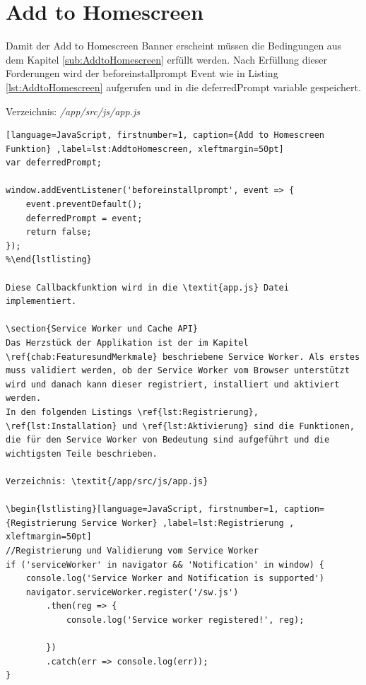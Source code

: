 \section{Add to Homescreen}
Damit der Add to Homescreen Banner erscheint müssen die Bedingungen aus dem Kapitel \ref{sub:AddtoHomescreen} erfüllt werden.
Nach Erfüllung dieser Forderungen wird der beforeinstallprompt Event wie in Listing \ref{lst:AddtoHomescreen} aufgerufen und in die deferredPrompt variable gespeichert.

Verzeichnis: \textit{/app/src/js/app.js}

\begin{lstlisting}[language=JavaScript, firstnumber=1, caption={Add to Homescreen Funktion} ,label=lst:AddtoHomescreen, xleftmargin=50pt]
var deferredPrompt;

window.addEventListener('beforeinstallprompt', event => {
    event.preventDefault();
    deferredPrompt = event;
    return false;
});
%\end{lstlisting}

Diese Callbackfunktion wird in die \textit{app.js} Datei implementiert. 

\section{Service Worker und Cache API}
Das Herzstück der Applikation ist der im Kapitel \ref{chab:FeaturesundMerkmale} beschriebene Service Worker. Als erstes muss validiert werden, ob der Service Worker vom Browser unterstützt wird und danach kann dieser registriert, installiert und aktiviert werden.
In den folgenden Listings \ref{lst:Registrierung}, \ref{lst:Installation} und \ref{lst:Aktivierung} sind die Funktionen, die für den Service Worker von Bedeutung sind aufgeführt und die wichtigsten Teile beschrieben.

Verzeichnis: \textit{/app/src/js/app.js}

\begin{lstlisting}[language=JavaScript, firstnumber=1, caption={Registrierung Service Worker} ,label=lst:Registrierung , xleftmargin=50pt]
//Registrierung und Validierung vom Service Worker
if ('serviceWorker' in navigator && 'Notification' in window) {
    console.log('Service Worker and Notification is supported')
    navigator.serviceWorker.register('/sw.js')
        .then(reg => {
            console.log('Service worker registered!', reg);

        })
        .catch(err => console.log(err));
}
\end{lstlisting}

